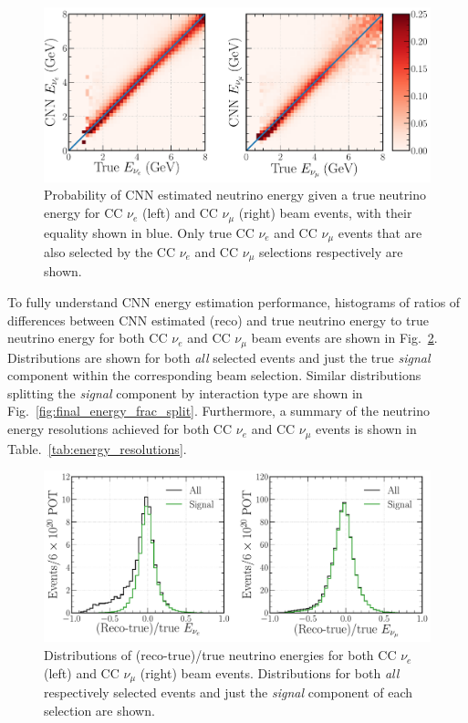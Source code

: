 \begin{figure} %
    \includegraphics[width=\textwidth]{diagrams/7-results/final_energy_2d.pdf}
    \caption[Probability of CNN estimated neutrino energy given a true neutrino energy]
    {Probability of CNN estimated neutrino energy given a true neutrino energy for CC $\nu_{e}$
        (left) and CC $\nu_{\mu}$ (right) beam events, with their equality shown in blue. Only
        true CC $\nu_{e}$ and CC $\nu_{\mu}$ events that are also selected by the CC $\nu_{e}$ and
        CC $\nu_{\mu}$ selections respectively are shown.}
    \label{fig:final_energy_2d}
\end{figure}

To fully understand CNN energy estimation performance, histograms of ratios of differences between
CNN estimated (reco) and true neutrino energy to true neutrino energy for both CC $\nu_{e}$ and CC
$\nu_{\mu}$ beam events are shown in Fig.~\ref{fig:final_energy_frac}. Distributions are shown for
both \emph{all} selected events and just the true \emph{signal} component within the corresponding
beam selection. Similar distributions splitting the \emph{signal} component by interaction type
are shown in Fig.~\ref{fig:final_energy_frac_split}. Furthermore, a summary of the neutrino energy
resolutions achieved for both CC $\nu_{e}$ and CC $\nu_{\mu}$ events is shown in
Table.~\ref{tab:energy_resolutions}.

\begin{figure} %
    \includegraphics[width=\textwidth]{diagrams/7-results/final_energy_frac.pdf}
    \caption[Distributions of (reco-true)/true neutrino energies]
    {Distributions of (reco-true)/true neutrino energies for both CC $\nu_{e}$ (left) and CC
        $\nu_{\mu}$ (right) beam events. Distributions for both \emph{all} respectively selected
        events and just the \emph{signal} component of each selection are shown.}
    \label{fig:final_energy_frac}
\end{figure}

